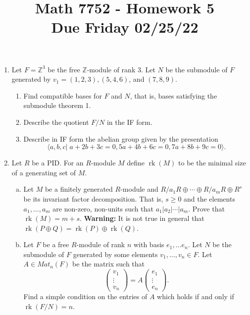 \documentclass[12pt,
psamsfonts]{amsart}
\title{Math 7752 - Homework 5\\
Due Friday 02/25/22}
\theoremstyle{remark}
\theoremstyle{definition}
\newcommand{\Z}{\mathbb{Z}\xspace}
\DeclareMathOperator{\rk}{rk}
\numberwithin{equation}{section}
\begin{document}
\maketitle

\begin{enumerate}
\item Let $F=\Z^3$ be the free $\Z$-module of rank $3$. Let $N$ be the submodule of $F$ generated by $v_1=(1,2,3), (5,4,6)$, and $(7,8,9)$. 
\begin{enumerate}
\item Find compatible bases for $F$ and $N$, that is, bases satisfying the submodule theorem 1. 
\item Describe the quotient $F/N$ in the IF form.
\item Describe in IF form the abelian group given by the presentation 
\[\langle a,b,c|\;a+2b+3c=0,5a+4b+6c=0, 7a+8b+9c=0\rangle.\]
\end{enumerate} 
\medskip 
\item Let $R$ be a PID. For an $R$-module $M$ define $\rk(M)$ to be the minimal size of a generating set of $M$.  \begin{enumerate}
[(a)]\item Let $M$ be a finitely generated $R$-module and $R/a_1R\oplus\cdots\oplus R/a_mR\oplus R^s$ be its invariant factor decomposition. That is, $s\geq 0$ and the elements $a_1,\ldots, a_m$ are non-zero, non-units such that $a_1|a_2|\cdots|a_m$. Prove that $\rk(M)=m+s$. \textbf{Warning:} It is not true in general that $\rk(P\oplus Q)=\rk(P)\oplus\rk(Q)$. 
\item Let $F$ be a free $R$-module of rank $n$ with basis $e_1,\ldots e_n$. Let $N$ be the submodule of $F$ generated by some elements $v_1,\ldots,v_n\in F$. Let $A\in Mat_n(F)$ be the matrix such that 
\[\left(\begin{array}{ccc}
v_1\\
\vdots\\
v_n
\end{array}\right)=A\left(\begin{array}{ccc}
e_1\\
\vdots\\
e_n
\end{array}\right).\] Find a simple condition on the entries of $A$ which holds if and only if $\rk(F/N)=n$. 
\end{enumerate} 
\medskip


\end{enumerate}
\end{document}
